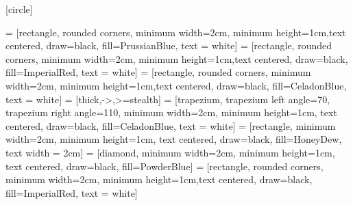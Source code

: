 [circle]






\setlength{\tabcolsep}{20pt}
\renewcommand{\arraystretch}{1.5}




 = [rectangle, rounded corners, minimum width=2cm, minimum height=1cm,text centered, draw=black, fill=PrussianBlue, text = white]
 = [rectangle, rounded corners, minimum width=2cm, minimum height=1cm,text centered, draw=black, fill=ImperialRed, text = white]
 = [rectangle, rounded corners, minimum width=2cm, minimum height=1cm,text centered, draw=black, fill=CeladonBlue, text = white]
 = [thick,->,>=stealth]
 = [trapezium, trapezium left angle=70, trapezium right angle=110, minimum width=2cm, minimum height=1cm, text centered, draw=black, fill=CeladonBlue, text = white]
 = [rectangle, minimum width=2cm, minimum height=1cm, text centered, draw=black, fill=HoneyDew, text width = 2cm]
 = [diamond, minimum width=2cm, minimum height=1cm, text centered, draw=black, fill=PowderBlue]
 = [rectangle, rounded corners, minimum width=2cm, minimum height=1cm,text centered, draw=black, fill=ImperialRed, text = white]


\usetikzlibrary{positioning}



\lstset{style=mystyle}